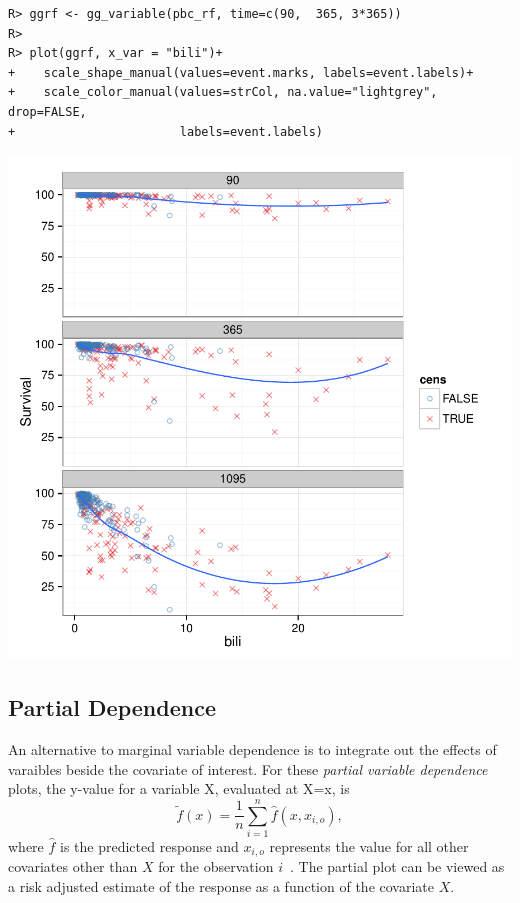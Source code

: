 \documentclass[nojss]{jss}\usepackage[]{graphicx}\usepackage[]{color}
\makeatletter
\def\maxwidth{ %
  \ifdim\Gin@nat@width>\linewidth
    \linewidth
  \else
    \Gin@nat@width
  \fi
}
\newenvironment{kframe}{%
 \def\at@end@of@kframe{}%
 \ifinner\ifhmode%
  \def\at@end@of@kframe{\end{minipage}}%
  \begin{minipage}{\columnwidth}%
 \fi\fi%
 \def\FrameCommand##1{\hskip\@totalleftmargin \hskip-\fboxsep
 \colorbox{shadecolor}{##1}\hskip-\fboxsep
     \hskip-\linewidth \hskip-\@totalleftmargin \hskip\columnwidth}%
 \MakeFramed {\advance\hsize-\width
   \@totalleftmargin\z@ \linewidth\hsize
   \@setminipage}}%
 {\par\unskip\endMakeFramed%
 \at@end@of@kframe}
\newenvironment{knitrout}{}{} %
\makeatother
\begin{document}
\begin{knitrout}\footnotesize
{}\color{fgcolor}\begin{kframe}
\begin{verbatim}
R> ggrf <- gg_variable(pbc_rf, time=c(90,  365, 3*365))
R> 
R> plot(ggrf, x_var = "bili")+
+    scale_shape_manual(values=event.marks, labels=event.labels)+
+    scale_color_manual(values=strCol, na.value="lightgrey", drop=FALSE,
+                       labels=event.labels)
\end{verbatim}
\end{kframe}

{\centering \includegraphics[width=\maxwidth]{figure/vig-variable-plot-stacks-1} 

}



\end{knitrout}

\subsection{Partial Dependence}\label{S:variablePlots}

An alternative to marginal variable dependence is to integrate out the effects of varaibles beside the covariate of interest. For these \emph{partial variable dependence} plots, the y-value for a variable X, evaluated at X=x, is
\[
\tilde{f}(x) = \frac{1}{n} \sum_{i=1}^n \hat{f}(x, x_{i,o}),
\]
where $\hat{f}$ is the predicted response and $x_{i,o}$ represents the value for all other covariates other than $X$ for the observation $i$~\citep{FriedmanGreedyfunction:2000}. The partial plot can be viewed as a risk adjusted estimate of the response as a function of the covariate $X$.
\end{document}
